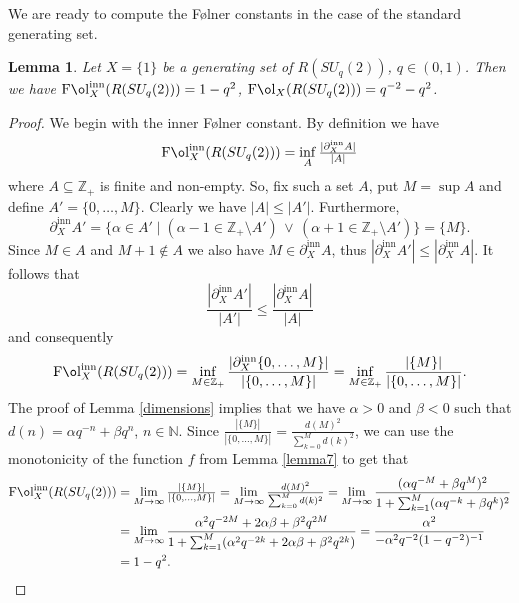 \documentclass[11 pt, leqno]{amsart}
\newcommand{\NN}{\mathbb{N}}
\newcommand{\ZZ}{\mathbb{Z}}
\DeclareMathOperator{\Fol}{F\mathrm{\o}l}
\newcommand{\FolinnX}{\operatorname{F\mathrm{\o}l}_{X}^{\operatorname{inn}}}
\DeclareMathOperator{\inn}{inn}
\newtheorem{lemma}[theorem]{Lemma}
\theoremstyle{definition}
\numberwithin{equation}{section}
\begin{document}
We are ready to compute the  F\o lner constants in the case of the standard generating set.

\begin{lemma}\label{lemma8}
	Let $X=\{1\}$ be a generating set of $R(SU_q(2))$, $q \in (0,1)$. Then we have $\FolinnX(R(SU_q(2)))=1-q^2$, 
	$\Fol_X(R(SU_q(2)))=q^{-2} - q^{2}$.
\end{lemma}

\begin{proof}
	We begin with the inner F\o lner constant.
	By definition we have
	\[
	\FolinnX(R(SU_q(2)))=\inf_A \tfrac{|\partial_X^{\inn} A| }{|A|}
	\]
	where $A\subseteq \ZZ_+$ is finite and non-empty. So, fix such a set $A$, put $M=\sup A$ and define  $A'=\{0,\dotsc ,M\}$. Clearly we have $|A|\le |A'|$. Furthermore,
	\[
	\partial_X^{\inn} A'=
	\{ \alpha\in A'\mid
(\alpha-1 \in \ZZ_+\setminus A' )\,\vee \,(\alpha+1 \in \ZZ_+ \setminus A')	\}=
	\{M\}.
	\]
	Since $M\in A$ and $M+1\notin A$ we also have $M\in \partial_X^{\inn} A$, thus $|\partial_X^{\inn} A'| \le |\partial_X^{\inn} A|$. It follows that
	\[
	\frac{ |\partial_X^{\inn} A'|}{|A'|}\le  \frac{ |\partial_X^{\inn} A|}{|A|}
	\]
	and consequently
	\[
	\FolinnX(R(SU_q(2)))=\inf_{M\in \ZZ_+} \frac{ |\partial_X^{\inn} \{0,\dotsc, M\}|}{|\{0,\dotsc, M\}|}=\inf_{M\in \ZZ_+} \frac{ |\{M\}|}{|\{0,\dotsc, M\}|}.
	\]
The proof of Lemma \ref{dimensions} implies that we have $\alpha >0$ and $\beta<0$ such that  $d(n) = \alpha q^{-n} + \beta q^n$, $n \in \NN$. Since $	\tfrac{|\{M\}|}{|\{0,\dotsc, M\}|}=
	\tfrac{d(M)^2}{\sum_{k=0}^{M} d(k)^2}$, we can use the monotonicity of the function $f$ from Lemma \ref{lemma7} to get that
	\begin{align*}
	\FolinnX(R(SU_q(2)))&=
	\lim_{M\to\infty}
	\tfrac{|\{M\}|}{|\{0,\dotsc, M\}|}=
	\lim_{M\to\infty}
	\tfrac{d(M)^2}{\sum_{k=0}^{M} d(k)^2} =
	\lim_{M\to\infty} \frac{(\alpha q^{-M} + \beta q^{M})^2}
	{1+ \sum_{k=1}^{M} (\alpha q^{-k}+ \beta q^k )^2 }
	\\
	&=
	\lim_{M\to\infty} \frac{\alpha^2 q^{-2M} + 2\alpha \beta  + \beta^2 q^{2M} 
	}
	{1 + \sum_{k=1}^{M}( \alpha^2 q^{-2k} +2\alpha \beta  +\beta^2 q^{2k} )}= \frac{\alpha^2}
	{-\alpha^2 q^{-2}(1-q^{-2})^{-1}
	} \\
&=1-q^2.
	\end{align*}
	

\end{proof}
\end{document}
